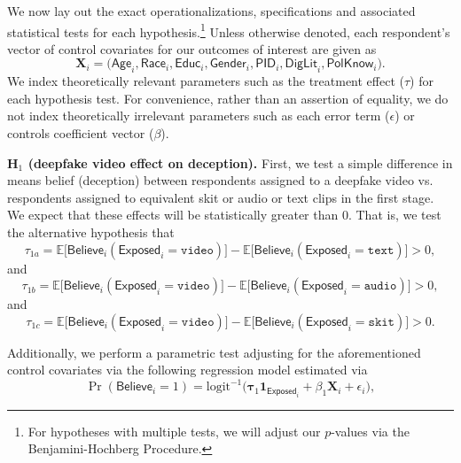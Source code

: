 \documentclass[12pt,letterpaper]{article}
\begin{document}
We now lay out the exact operationalizations, specifications and associated statistical tests for each hypothesis.\footnote{For hypotheses with multiple tests, we will adjust our $p$-values via the Benjamini-Hochberg Procedure.} Unless otherwise denoted, each respondent's vector of control covariates for our outcomes of interest are given as
\begin{equation}
     \mathbf{X}_i = \Big(\textsf{Age}_i, \textsf{Race}_i, \textsf{Educ}_i, \textsf{Gender}_i,\textsf{PID}_i, \textsf{DigLit}_i, \textsf{PolKnow}_i \Big).
\end{equation}
\noindent We index theoretically relevant parameters such as the treatment effect ($\tau$) for each hypothesis test. For convenience, rather than an assertion of equality, we do not index theoretically irrelevant parameters such as each error term ($\epsilon$) or controls coefficient vector ($\beta$).

\noindent \textbf{H$_1$ (deepfake video effect on deception).} First, we test a simple difference in means belief (deception) between respondents assigned to a deepfake video vs. respondents assigned to equivalent skit or audio or text clips in the first stage. We expect that these effects will be statistically greater than 0. That is, we test the alternative hypothesis that
\begin{equation}
    \tau_{1a} = \mathbb{E} \Big[ \textsf{Believe}_i(\textsf{Exposed}_i = \texttt{video})\Big] - \mathbb{E} \Big[\textsf{Believe}_i(\textsf{Exposed}_i = \texttt{text}) \Big] > 0,
\end{equation}
and
\begin{equation}
    \tau_{1b} = \mathbb{E} \Big[ \textsf{Believe}_i(\textsf{Exposed}_i = \texttt{video})\Big] - \mathbb{E} \Big[\textsf{Believe}_i(\textsf{Exposed}_i = \texttt{audio}) \Big] > 0,
\end{equation}
and
\begin{equation}
    \tau_{1c} = \mathbb{E} \Big[ \textsf{Believe}_i(\textsf{Exposed}_i = \texttt{video})\Big] - \mathbb{E} \Big[\textsf{Believe}_i(\textsf{Exposed}_i = \texttt{skit}) \Big] > 0.
\end{equation}

\noindent Additionally, we perform a parametric test adjusting for the aforementioned control covariates via the following regression model estimated via
\begin{equation}
    \Pr(\textsf{Believe}_i=1) = \text{logit}^{-1}\Big(\bm{\tau}_1 \mathbf{1}_{\textsf{Exposed}_i}
    + \beta_{1}\mathbf{X}_i + \epsilon_i\Big),
\end{equation}
\end{document}
